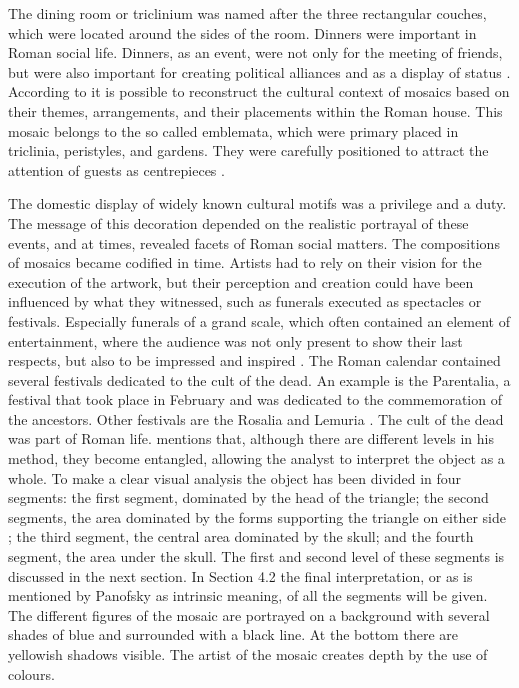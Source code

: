 	The dining room or triclinium was named after the three rectangular couches, which were located around the sides of the room. Dinners were important in Roman social life. Dinners, as an event, were not only for the meeting of friends, but were also important for creating political alliances and as a display of status \parencite [119] {Ellis_1991}. According to \textcite [105-106] {Kondoleon_1991} it is possible to reconstruct the cultural context of mosaics based on their themes, arrangements, and their placements within the Roman house. This mosaic belongs to the so called emblemata, which were primary placed in triclinia, peristyles, and gardens. They were carefully positioned to attract the attention of guests as centrepieces \parencite [97] {Stewart_2004}.

	The domestic display of widely known cultural motifs was a privilege and a duty. The message of this decoration depended on the realistic portrayal of these events, and at times, revealed facets of Roman social matters. The compositions of mosaics became codified in time. Artists had to rely on their vision for the execution of the artwork, but their perception and creation could have been influenced by what they witnessed, such as funerals executed as spectacles or festivals. Especially funerals of a grand scale, which often contained an element of entertainment, where the audience was not only present to show their last respects, but also to be impressed and inspired  \parencites[112]{Kondoleon_1991}[89]{Hope_2009}. The Roman calendar contained several festivals dedicated to the cult of the dead. An example is the Parentalia, a festival that took place in February and was dedicated to the commemoration of the ancestors. Other festivals are the Rosalia and Lemuria \parencite[123--124]{Erasmo_2012}. The cult of the dead was part of Roman life.	\textcite {Panofsky_1939} mentions that, although there are different levels in his method, they become entangled, allowing the analyst to interpret the object as a whole. To make a clear visual analysis the object has been divided in four segments: the first segment, dominated by the  head of the triangle; the second segments, the area dominated by the forms supporting the triangle on either side ; the third segment, the central area dominated by the skull; and the fourth segment, the area under the skull. The first and second level of these segments is discussed in the next section. In Section 4.2 the final interpretation, or as is mentioned by Panofsky as intrinsic meaning, of all the segments will be given. The different figures of the mosaic are portrayed on a background with several shades of blue and surrounded with a black line. At the bottom there are yellowish shadows visible. The artist of the mosaic creates depth by the use of colours. 
	
